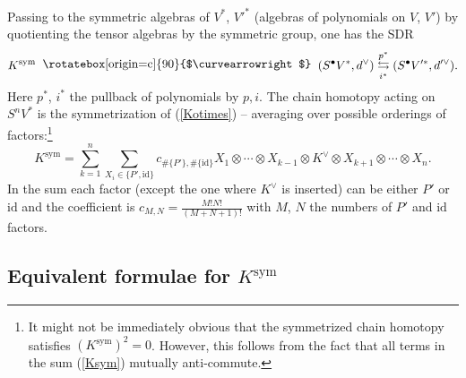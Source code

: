 \documentclass{amsart}
\theoremstyle{plain} %
\theoremstyle{definition}
\theoremstyle{remark}
\newcommand{\mr}{\mathrm}
\newcommand{\bt}{\bullet}
\newcommand{\SDR}[5]{#5\;\;\raisebox{1.3pt}{\rotatebox[origin=c]{90}{$\curvearrowright$}}\;\; #1 \underset{#4}{\stackrel{#3}{\leftrightarrows}} #2}  %
\begin{document}
Passing to the symmetric algebras of $V^*$, $V'^*$ (algebras of polynomials on $V$, $V'$) by quotienting the tensor algebras by the symmetric group, one has the SDR
\begin{equation}
        \SDR{(S^\bt V^*,d^\vee)}{(S^\bt V'^*,d'^\vee)}{p^*}{i^*}{K^\mr{sym}}.
\end{equation}
Here $p^*$, $i^*$ the pullback of polynomials by $p,i$. The chain homotopy acting on $S^nV^*$ is the symmetrization of (\ref{Kotimes}) -- averaging over possible orderings of factors:\footnote{
It might not be immediately obvious that the symmetrized chain homotopy satisfies $(K^\mr{sym})^2=0$. However, this follows from the fact that all terms in the sum (\ref{Ksym}) mutually anti-commute.
}
\begin{equation}\label{Ksym}
    K^\mr{sym}=\sum_{k=1}^{n} \sum_{X_i\in \{P',\mr{id}\}}c_{\#\{P'\},\#\{\mr{id}\}} X_1\otimes\cdots\otimes X_{k-1}\otimes K^\vee \otimes X_{k+1}\otimes \cdots \otimes X_n.
\end{equation}
In the sum each factor (except the one where $K^\vee$ is inserted) can be either $P'$ or $\mr{id}$ and the coefficient is $c_{M,N}=\frac{M!N!}{(M+N+1)!}$ with  $M$, $N$ the numbers of $P'$ and $\mr{id}$ factors.

\subsection{Equivalent formulae for \texorpdfstring{$K^\mr{sym}$}{Ksym}
}
\end{document}
